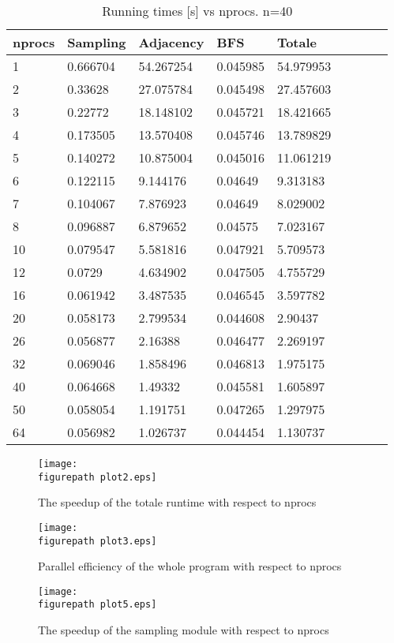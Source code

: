 \begin{table}[h!] 
\centering
\caption{Running times [s] vs nprocs. n=40\label{fig:runtimes_p}}
\begin{tabular}{|l|l|l|l|l|l|l|l|l|}
\hline
nprocs&	Sampling&	Adjacency&	BFS&			Totale  \\ \hline
1&	0.666704	&	54.267254&	0.045985	&	54.979953\\
2&	0.33628	&	27.075784&	0.045498	&	27.457603\\
3&	0.22772	&	18.148102&	0.045721	&	18.421665\\
4&	0.173505	&	13.570408&	0.045746	&	13.789829\\
5&	0.140272	&	10.875004&	0.045016	&	11.061219\\
6&	0.122115	&	9.144176	&	0.04649	&	9.313183\\
7&	0.104067	&	7.876923	&	0.04649	&	8.029002\\
8&	0.096887	&	6.879652	&	0.04575	&	7.023167\\
10&	0.079547	&	5.581816	&	0.047921	&	5.709573\\
12&	0.0729	&	4.634902	&	0.047505	&	4.755729\\
16&	0.061942	&	3.487535	&	0.046545	&	3.597782\\
20&	0.058173	&	2.799534	&	0.044608	&	2.90437\\
26&	0.056877	&	2.16388	&	0.046477	&	2.269197\\
32&	0.069046	&	1.858496	&	0.046813	&	1.975175\\
40&	0.064668	&	1.49332	&	0.045581	&	1.605897\\
50&	0.058054	&	1.191751	&	0.047265	&	1.297975\\
64&	0.056982	&	1.026737	&	0.044454	&	1.130737\\
\hline
\end{tabular}
\end{table}


\begin{figure}[h!] 
 \center 
 \texttt{[image: \\figurepath plot2.eps]}
 \caption{ The speedup of the totale runtime with respect to nprocs \label{fig:speedup_tot}}
 \end{figure}

\begin{figure}[h!] 
 \center 
 \texttt{[image: \\figurepath plot3.eps]}
 \caption{ Parallel efficiency of the whole program with respect to nprocs \label{fig:parallel_efficiency_p}}
 \end{figure}

\begin{figure}[h!] 
 \center 
 \texttt{[image: \\figurepath plot5.eps]}
 \caption{ The speedup of the sampling module with respect to nprocs \label{fig:speedup_sampling}}
 \end{figure}


